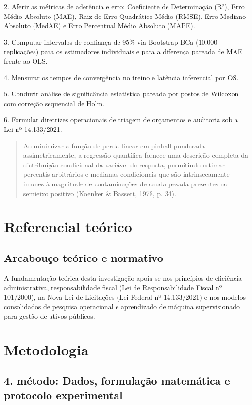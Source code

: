 \documentclass[12pt,a4paper]{article}
\begin{document}
2. Aferir as métricas de aderência e erro: Coeficiente de Determinação (R²), Erro Médio Absoluto (MAE), Raiz do Erro Quadrático Médio (RMSE), Erro Mediano Absoluto (MedAE) e Erro Percentual Médio Absoluto (MAPE).

3. Computar intervalos de confiança de 95\% via Bootstrap BCa (10.000 replicações) para os estimadores individuais e para a diferença pareada de MAE frente ao OLS.

4. Mensurar os tempos de convergência no treino e latência inferencial por OS.

5. Conduzir análise de significância estatística pareada por postos de Wilcoxon com correção sequencial de Holm.

6. Formular diretrizes operacionais de triagem de orçamentos e auditoria sob a Lei nº 14.133/2021.

\begin{quote}
\small Ao minimizar a função de perda linear em pinball ponderada assimetricamente, a regressão quantílica fornece uma descrição completa da distribuição condicional da variável de resposta, permitindo estimar percentis arbitrários e medianas condicionais que são intrinsecamente imunes à magnitude de contaminações de cauda pesada presentes no semieixo positivo (Koenker \& Bassett, 1978, p. 34).
\end{quote}


\section{Referencial teórico}


\subsection{Arcabouço teórico e normativo}

A fundamentação teórica desta investigação apoia-se nos princípios de eficiência administrativa, responsabilidade fiscal (Lei de Responsabilidade Fiscal nº 101/2000), na Nova Lei de Licitações (Lei Federal nº 14.133/2021) e nos modelos consolidados de pesquisa operacional e aprendizado de máquina supervisionado para gestão de ativos públicos.


\section{Metodologia}


\subsection{4. método: Dados, formulação matemática e protocolo experimental}
\end{document}
